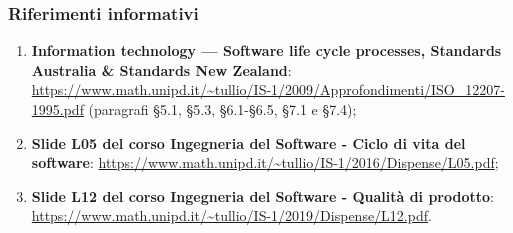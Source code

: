 \subsubsection{Riferimenti informativi}
\begin{enumerate}
	\item \textbf{Information technology — Software life cycle processes, Standards Australia \& Standards New Zealand}: \url{https://www.math.unipd.it/~tullio/IS-1/2009/Approfondimenti/ISO_12207-1995.pdf} (paragrafi §5.1, §5.3, §6.1-§6.5, §7.1 e §7.4);
	\item \textbf{Slide L05 del corso Ingegneria del Software - Ciclo di vita del software}: \url{https://www.math.unipd.it/~tullio/IS-1/2016/Dispense/L05.pdf};
	\item \textbf{Slide L12 del corso Ingegneria del Software - Qualità di prodotto}: \url{https://www.math.unipd.it/~tullio/IS-1/2019/Dispense/L12.pdf}.

	
	
	
	
	
\end{enumerate}


